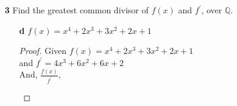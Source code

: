 \documentclass[paper=usletter, fontsize=12pt]{article}
\begin{document}
\begin{enumerate}
\begin{enumerate}
\begin{enumerate}
\begin{proof}
                    \begin{equation*}
                        \begin{array}{*2r @{\hskip\arraycolsep}c@{\hskip\arraycolsep} *7r}
                            &    &&  &&  +x^3  && +4x & +3 \\
                            \cline{3-9}
                            & x^2 + 5 &\big)& +x^5 & +0x^4 & +2x^3 &+3x^2 &+x &+6 \\
                            &    &&  -(+x^5 && +5x^3) \\
                            \cline{4-8}
                            &    &&   &&  +4x^3 & +3x^2 & +x \\
                            &    &&   &&  -(+4x^3 & & +6x)\\
                            \cline{6-8}
                            &    &&    &    & & +3x^2 & +2x \\
                            &    &&    &    & &-( +3x^2 & +2x) \\
                            \cline{7-9}
                            &    &&    &    &  & & & +6\\
                        \end{array}
                    \end{equation*}

                    Therefore,
                    \begin{align*}
                        f(x) & = g(x)(x^3+4x+3) + 6\\
                        & = (x^2+5)(x^3+4x+3) + 6 \Mod{\mathbb{Z}_7} \qedhere
                    \end{align*}

                \end{proof}

            \end{enumerate}

            \item[\textbf{3}] Find the greatest common divisor of $f(x)$ and
            $f^\prime$, over $\mathbb{Q}$.
            \begin{enumerate}

                \item[\textbf{d}] $f(x) = x^4+2x^3+3x^2+2x+1$
                \begin{proof}

                    Given $f(x) = x^4+2x^3+3x^2+2x+1$\\
                    and $f^\prime = 4x^3+6x^2+6x+2$\\
                    And, $\frac{f(x)}{f^\prime}$,\\
                    \begin{center}


\end{center}
\end{proof}
\end{enumerate}
\end{enumerate}
\end{enumerate}
\end{document}
